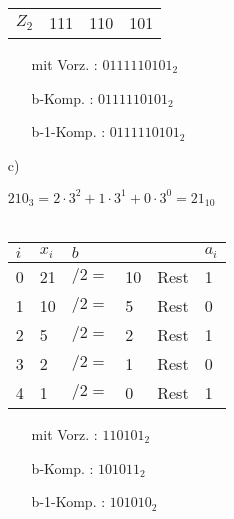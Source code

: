\documentclass{article}
\begin{document}
\begin{enumerate}
\begin{minipage}[t]{0.5\textwidth}
\begin{tabular}[t]{l|ccc}
                \hline
                $Z_{2}$ & 111 & 110 & 101
            \end{tabular} 
        \end{minipage}
        \begin{minipage}[t]{0.4\textwidth}
            \begin{enumerate}
                \item[mit Vorz.]: $0111110101_2$
                \item[b-Komp.]: $0111110101_2$
                \item[b-1-Komp.]: $0111110101_2$
            \end{enumerate}
            \hfill
        \end{minipage}
        \item[c)]
        \begin{minipage}[t]{0.5\textwidth}
            $ 210_3 = 2\cdot 3^2 + 1\cdot 3^1 + 0\cdot 3^0 = 21_{10}$ \\\\
            \begin{tabular}{llllll}
                $i$ & $x_i$ & $b$       &       &       & $a_i$ \\
                \hline 
                0   & 21   & $/2 = $   & 10    & Rest  & 1 \\
                1   & 10   & $/2 = $   & 5     & Rest  & 0 \\
                2   & 5    & $/2 = $   & 2     & Rest  & 1 \\
                3   & 2    & $/2 = $   & 1     & Rest  & 0 \\
                4   & 1    & $/2 = $   & 0     & Rest  & 1
            \end{tabular}
        \end{minipage}
        \begin{minipage}[t]{0.4\textwidth}
            \begin{enumerate}
                \item[mit Vorz.]: $110101_2$
                \item[b-Komp.]: $101011_2$
                \item[b-1-Komp.]: $101010_2$
            \end{enumerate}
        \end{minipage}
    \end{enumerate}
\end{document}
